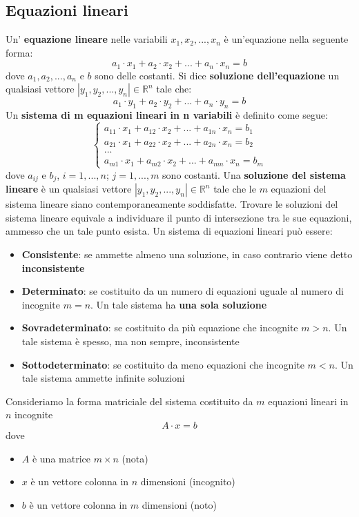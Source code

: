 \documentclass[12pt]{article}
\begin{document}
\subsection{Equazioni lineari}
Un' \textbf{equazione lineare} nelle variabili $x_1, x_2, ..., x_n$ è un'equazione nella seguente forma:
$$a_1 \cdot x_1 + a_2 \cdot x_2 + ... + a_n \cdot x_n = b$$
dove $a_1, a_2, ..., a_n$ e $b$ sono delle costanti.
Si dice \textbf{soluzione dell'equazione} un qualsiasi vettore $|y_1, y_2, ..., y_n| \in \mathbb{R}^n$ tale che:
$$a_1 \cdot y_1 + a_2 \cdot y_2 + ... + a_n \cdot y_n = b$$
Un \textbf{sistema di m equazioni lineari in n variabili} è definito come segue:
$$\begin{cases}
    a_{11} \cdot x_1 + a_{12} \cdot x_2 + ... + a_{1n} \cdot x_n = b_1 \\
    a_{21} \cdot x_1 + a_{22} \cdot x_2 + ... + a_{2n} \cdot x_n = b_2 \\
    ... \\
    a_{m1} \cdot x_1 + a_{m2} \cdot x_2 + ... + a_{mn} \cdot x_n = b_m
\end{cases}$$
dove $a_{ij}$ e $b_{j}$, $i = 1,...,n$; $j = 1,...,m$ sono costanti.
Una \textbf{soluzione del sistema lineare} è un qualsiasi vettore $|y_1, y_2, ..., y_n| \in \mathbb{R}^n$ tale che le $m$ equazioni
del sistema lineare siano contemporaneamente soddisfatte.
Trovare le soluzioni del sistema lineare equivale a individuare il punto di intersezione tra le sue equazioni, ammesso che un tale punto esista. \newline
Un sistema di equazioni lineari può essere:
\begin{itemize}
    \item \textbf{Consistente}: se ammette almeno una soluzione, in caso contrario viene detto \textbf{inconsistente}
    \item \textbf{Determinato}: se costituito da un numero di equazioni uguale al numero di incognite $m = n$. Un tale sistema ha \textbf{una sola soluzione}
    \item \textbf{Sovradeterminato}: se costituito da più equazione che incognite $m>n$. Un tale sistema è spesso, ma non sempre, inconsistente
    \item \textbf{Sottodeterminato}: se costituito da meno equazioni che incognite $m<n$. Un tale sistema ammette infinite soluzioni
\end{itemize}
Consideriamo la forma matriciale del sistema costituito da $m$ equazioni lineari in $n$ incognite
$$A \cdot x = b$$
dove
\begin{itemize}
    \item $A$ è una matrice $m \times n$ (nota)
    \item $x$ è un vettore colonna in $n$ dimensioni (incognito)
    \item $b$ è un vettore colonna in $m$ dimensioni (noto)
\end{itemize}
\end{document}
